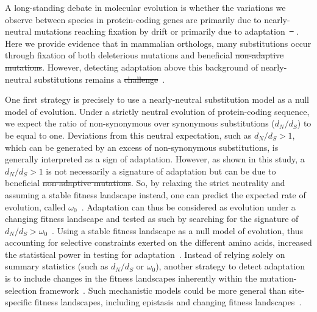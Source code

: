 \documentclass{article} %
\newcommand{\dn}{d_N}
\newcommand{\ds}{d_S}
\newcommand{\dnds}{\dn / \ds}
\providecommand{\DIFaddtex}[1]{{\protect\color{blue}\uwave{#1}}} %
\providecommand{\DIFdeltex}[1]{{\protect\color{red}\sout{#1}}}                      %
\providecommand{\DIFaddbegin}{} %
\providecommand{\DIFaddend}{} %
\providecommand{\DIFdelbegin}{} %
\providecommand{\DIFdelend}{} %
\providecommand{\DIFadd}[1]{\texorpdfstring{\DIFaddtex{#1}}{#1}} %
\providecommand{\DIFdel}[1]{\texorpdfstring{\DIFdeltex{#1}}{}} %
\newcommand{\DIFscaledelfig}{0.5}
\newlength{\DIFdelgraphicswidth} %
\newlength{\DIFdelgraphicsheight} %
\newcommand{\DIFaddincludegraphics}[2][]{{\color{blue}\fbox{\DIFOincludegraphics[#1]{#2}}}} %
\newcommand{\DIFdelincludegraphics}[2][]{%
\sbox{\DIFdelgraphicsbox}{\DIFOincludegraphics[#1]{#2}}%
\settoboxwidth{\DIFdelgraphicswidth}{\DIFdelgraphicsbox} %
\settoboxtotalheight{\DIFdelgraphicsheight}{\DIFdelgraphicsbox} %
\scalebox{\DIFscaledelfig}{%
\parbox[b]{\DIFdelgraphicswidth}{\usebox{\DIFdelgraphicsbox}\\[-\baselineskip] \rule{\DIFdelgraphicswidth}{0em}}\llap{\resizebox{\DIFdelgraphicswidth}{\DIFdelgraphicsheight}{%
\setlength{\unitlength}{\DIFdelgraphicswidth}%
\begin{picture}(1,1)%
\thicklines\linethickness{2pt} %
{\color[rgb]{1,0,0}\put(0,0){\framebox(1,1){}}}%
{\color[rgb]{1,0,0}\put(0,0){\line( 1,1){1}}}%
{\color[rgb]{1,0,0}\put(0,1){\line(1,-1){1}}}%
\end{picture}%
}\hspace*{3pt}}} %
} %
\DeclareRobustCommand{\DIFaddbegin}{\DIFOaddbegin \let\includegraphics\DIFaddincludegraphics} %
\DeclareRobustCommand{\DIFaddend}{\DIFOaddend \let\includegraphics\DIFOincludegraphics} %
\DeclareRobustCommand{\DIFdelbegin}{\DIFOdelbegin \let\includegraphics\DIFdelincludegraphics} %
\DeclareRobustCommand{\DIFdelend}{\DIFOaddend \let\includegraphics\DIFOincludegraphics} %
\begin{document}
    A long-standing debate in molecular evolution is whether the variations we observe between species in protein-coding genes are primarily due to nearly-neutral mutations reaching fixation by drift or primarily due to adaptation~\DIFdelbegin \DIFdel{\mbox{%
\cite{kimura_evolutionary_1968,jensen_importance_2019,gillespie_substitution_1994,ohta_nearly_1992}}\hskip0pt%
}\DIFdelend \DIFaddbegin \DIFadd{\mbox{%
\cite{kimura_evolutionary_1968,jensen_importance_2019,gillespie_substitution_1994,Ohta1992}}\hskip0pt%
}\DIFaddend .
    Here we provide evidence that in mammalian orthologs, many substitutions occur through fixation of both deleterious mutations and beneficial \DIFdelbegin \DIFdel{non-adaptive mutations}\DIFdelend \DIFaddbegin \DIFadd{back-mutations}\DIFaddend .
    However, detecting adaptation above this background of nearly-neutral substitutions remains a \DIFdelbegin \DIFdel{challenge}\DIFdelend \DIFaddbegin \DIFadd{central question}\DIFaddend ~\cite{kimura_evolutionary_1968,ohta_development_1996}.

    One first strategy is precisely to use a nearly-neutral substitution model as a null model of evolution.
    Under a strictly neutral evolution of protein-coding sequence, we expect the ratio of non-synonymous over synonymous substitutions ($\dnds$) to be equal to one.
    Deviations from this neutral expectation, such as $\dnds > 1$, which can be generated by an excess of non-synonymous substitutions, is generally interpreted as a sign of adaptation.
    However, as shown in this study, a $\dnds > 1$ is not necessarily a signature of adaptation but can be due to beneficial \DIFdelbegin \DIFdel{non-adaptive mutations}\DIFdelend \DIFaddbegin \DIFadd{back-mutations}\DIFaddend .
    So, by relaxing the strict neutrality and assuming a stable fitness landscape instead, one can predict the expected rate of evolution, called $\omega_0$~\cite{spielman_relationship_2015, dosreis_how_2015}.
    Adaptation can thus be considered as evolution under a changing fitness landscape and tested as such by searching for the signature of $\dnds > \omega_0$~\cite{cvijovic_fate_2015, rodrigue_detecting_2017, rodrigue_bayesian_2021}.
    Using a stable fitness landscape as a null model of evolution, thus accounting for selective constraints exerted on the different amino acids, increased the statistical power in testing for adaptation~\cite{latrille_genes_2023}.
    Instead of relying solely on summary statistics (such as $\dnds$ or $\omega_0$), another strategy to detect adaptation is to include changes in the fitness landscapes inherently within the mutation-selection framework~\cite{tamuri_mutationselection_2021}.
    Such mechanistic models could be more general than site-specific fitness landscapes, including epistasis and changing fitness landscapes~\cite{goldstein_sequence_2017, stolyarova_senescence_2020}.
\end{document}
